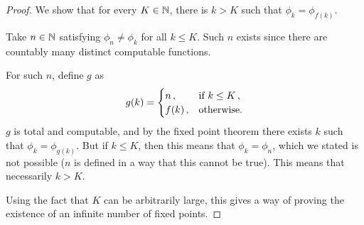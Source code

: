 \begin{solution}
\begin{proof}
	We show that for every \(K \in \mathbb{N}\), there is \(k > K\)
	such that \(\phi_k = \phi_{f(k)}\).

	Take \(n \in \mathbb{N}\) satisfying \(\phi_n \ne \phi_k\) for all \(k \le K\).
	Such \(n\) exists since there are countably many
	distinct computable functions.

	For such \(n\), define \(g\) as
	\[
	g(k) = \begin{cases} n\,, & \textnormal{if } k \le K\,,\\
	f(k)\,, & \textnormal{otherwise.}\end{cases}
	\]
	\(g\) is total and computable,
	and by the fixed point theorem there exists \(k\)
	such that \(\phi_k = \phi_{g(k)}\).
	But if \(k \le K\), then this means that \(\phi_k = \phi_n\),
	which we stated is not possible
	(\(n\) is defined in a way that this cannot be true).
	This means that necessarily \(k > K\).

	Using the fact that \(K\) can be arbitrarily large,
	this gives a way of proving the existence
	of an infinite number of fixed points.
\end{proof}
\end{solution}
